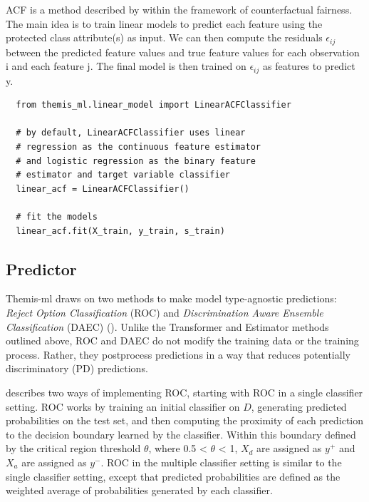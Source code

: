 \documentclass[man,natbib]{apa6}
\begin{document}
ACF is a method described by \cite{kusner2017counterfactual} within the
framework of counterfactual fairness. The main idea is to train linear models to
predict each feature using the protected class attribute(s) as input. We can
then compute the residuals \(\epsilon_{ij}\) between the predicted feature
values and true feature values for each observation i and each feature j. The
final model is then trained on \(\epsilon_{ij}\) as features to predict y.

\begin{verbatim}
  from themis_ml.linear_model import LinearACFClassifier

  # by default, LinearACFClassifier uses linear
  # regression as the continuous feature estimator
  # and logistic regression as the binary feature
  # estimator and target variable classifier
  linear_acf = LinearACFClassifier()

  # fit the models
  linear_acf.fit(X_train, y_train, s_train)
\end{verbatim}

\subsection{Predictor}

Themis-ml draws on two methods to make model type-agnostic predictions:
\emph{Reject Option Classification} (ROC) and \emph{Discrimination Aware
Ensemble Classification} (DAEC) (\citealp{kamiran2012decision}). Unlike the
Transformer and Estimator methods outlined above, ROC and DAEC do not modify the
training data or the training process. Rather, they postprocess predictions in a
way that reduces potentially discriminatory (PD) predictions.

\cite{kamiran2012decision} describes two ways of implementing ROC, starting with
ROC in a single classifier setting. ROC works by training an initial classifier
on \(D\), generating predicted probabilities on the test set, and then computing the
proximity of each prediction to the decision boundary learned by the classifier.
Within this boundary defined by the critical region threshold \(\theta\), where
0.5 < \(\theta\) < 1, \(X_d\) are assigned as \(y^{+}\) and \(X_a\) are assigned
as \(y^{-}\). ROC in the multiple classifier setting is similar to the single
classifier setting, except that predicted probabilities are defined as the
weighted average of probabilities generated by each classifier.
\end{document}
